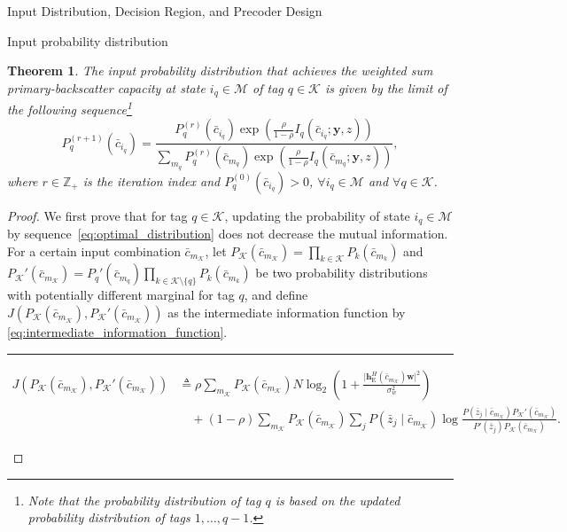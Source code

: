 \documentclass[journal]{IEEEtran}
\newtheorem{theorem}{Theorem}
\begin{document}
\begin{section}{Input Distribution, Decision Region, and Precoder Design}
\begin{subsection}{Input probability distribution}
			\begin{theorem}
				The input probability distribution that achieves the weighted sum primary-backscatter capacity at state $i_q \in \mathcal{M}$ of tag $q \in \mathcal{K}$ is given by the limit of the following sequence\footnote{Note that the probability distribution of tag $q$ is based on the updated probability distribution of tags $1,\ldots,q-1$.}
				\begin{equation}
					P_q^{(r+1)}(\bar{c}_{i_q}) = \frac{P_q^{(r)}(\bar{c}_{i_q}) \exp \left( \frac{\rho}{1 - \rho} I_q(\bar{c}_{i_q};\boldsymbol{y},z) \right)}{\sum_{m_q} P_q^{(r)}(\bar{c}_{m_q}) \exp \left( \frac{\rho}{1 - \rho} I_q(\bar{c}_{m_q};\boldsymbol{y},z) \right)},
					\label{eq:optimal_distribution}
				\end{equation}
				where $r \in \mathbb{Z}_+$ is the iteration index and $P_q^{(0)}(\bar{c}_{i_q}) > 0$, $\forall i_q \in \mathcal{M}$ and $\forall q \in \mathcal{K}$.
				\label{th:optimal_distribution}
			\end{theorem}
			\begin{proof}
				We first prove that for tag $q \in \mathcal{K}$, updating the probability of state $i_q \in \mathcal{M}$ by sequence~\eqref{eq:optimal_distribution} does not decrease the mutual information.
				For a certain input combination $\bar{c}_{m_{\mathcal{K}}}$, let $P_{\mathcal{K}}(\bar{c}_{m_{\mathcal{K}}}) = \prod_{k \in \mathcal{K}} P_k(\bar{c}_{m_k})$ and $P_{\mathcal{K}}'(\bar{c}_{m_{\mathcal{K}}}) = P_q'(\bar{c}_{m_q}) \prod_{k \in \mathcal{K} \setminus \{q\}} P_k(\bar{c}_{m_k})$ be two probability distributions with potentially different marginal for tag $q$, and define $J \left( P_{\mathcal{K}}(\bar{c}_{m_{\mathcal{K}}}),P_{\mathcal{K}}'(\bar{c}_{m_{\mathcal{K}}}) \right)$ as the intermediate information function by \eqref{eq:intermediate_information_function}.
				\begin{figure*}[!b]
					\hrule
					\begin{align}
						J \left( P_{\mathcal{K}}(\bar{c}_{m_{\mathcal{K}}}),P_{\mathcal{K}}'(\bar{c}_{m_{\mathcal{K}}}) \right)
						& \triangleq \rho \sum_{m_{\mathcal{K}}} P_{\mathcal{K}}(\bar{c}_{m_{\mathcal{K}}}) N \log_2 \left(1 + \frac{\lvert \boldsymbol{h}_{\mathrm{E}}^H(\bar{c}_{m_{\mathcal{K}}}) \boldsymbol{w} \rvert^2}{\sigma_w^2}\right)\nonumber\\
						& \quad + (1 - \rho) \sum_{m_{\mathcal{K}}} P_{\mathcal{K}}(\bar{c}_{m_{\mathcal{K}}}) \sum_j P(\bar{z}_j \mid \bar{c}_{m_{\mathcal{K}}}) \log \frac{P(\bar{z}_j \mid \bar{c}_{m_{\mathcal{K}}}) P_{\mathcal{K}}'(\bar{c}_{m_{\mathcal{K}}})}{P'(\bar{z}_j) P_{\mathcal{K}}(\bar{c}_{m_{\mathcal{K}}})}.

\end{align}
\end{figure*}
\end{proof}
\end{subsection}
\end{section}
\end{document}
